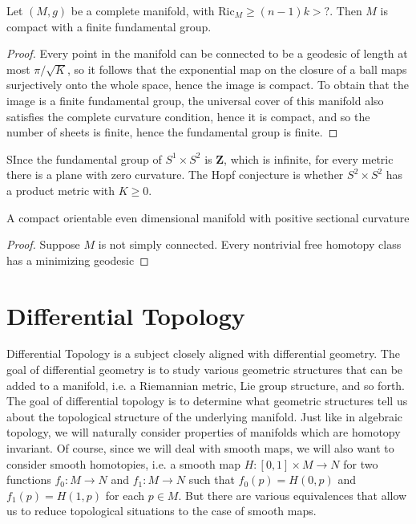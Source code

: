 \begin{corollary}
    Let $(M,g)$ be a complete manifold, with $\text{Ric}_M \geq (n-1)k > ?$. Then $M$ is compact with a finite fundamental group.
\end{corollary}
\begin{proof}
    Every point in the manifold can be connected to be a geodesic of length at most $\pi/\sqrt{K}$, so it follows that the exponential map on the closure of a ball maps surjectively onto the whole space, hence the image is compact. To obtain that the image is a finite fundamental group, the universal cover of this manifold also satisfies the complete curvature condition, hence it is compact, and so the number of sheets is finite, hence the fundamental group is finite.
\end{proof}

\begin{example}
    SInce the fundamental group of $S^1 \times S^2$ is $\mathbf{Z}$, which is infinite, for every metric there is a plane with zero curvature. The Hopf conjecture is whether $S^2 \times S^2$ has a product metric with $K \geq 0$.
\end{example}

\begin{theorem}[Synge]
    A compact orientable even dimensional manifold with positive sectional curvature
\end{theorem}
\begin{proof}
    Suppose $M$ is not simply connected. Every nontrivial free homotopy class has a minimizing geodesic
\end{proof}










\part{Differential Topology}

Differential Topology is a subject closely aligned with differential geometry. The goal of differential geometry is to study various geometric structures that can be added to a manifold, i.e. a Riemannian metric, Lie group structure, and so forth. The goal of differential topology is to determine what geometric structures tell us about the topological structure of the underlying manifold. Just like in algebraic topology, we will naturally consider properties of manifolds which are homotopy invariant. Of course, since we will deal with smooth maps, we will also want to consider smooth homotopies, i.e. a smooth map $H: [0,1] \times M \to N$ for two functions $f_0: M \to N$ and $f_1: M \to N$ such that $f_0(p) = H(0,p)$ and $f_1(p) = H(1,p)$ for each $p \in M$. But there are various equivalences that allow us to reduce topological situations to the case of smooth maps.

